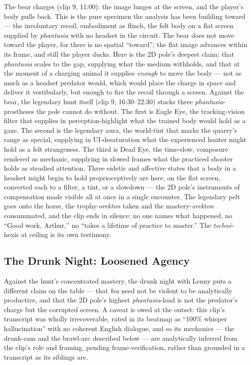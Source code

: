 The bear charges (clip 9, 11:00): the image lunges at the screen, and the player's body pulls back. This is the pure specimen the analysis has been building toward — the involuntary recoil, embodiment as flinch, the felt body on a flat screen supplied by \textit{phantasia} with no headset in the circuit. The bear does not move toward the player, for there is no spatial ``toward''; the flat image advances within its frame, and still the player ducks. Here is the 2D pole's deepest claim: that \textit{phantasia} scales to the gap, supplying what the medium withholds, and that at the moment of a charging animal it supplies \textit{enough} to move the body — not as much as a headset predator would, which would place the charge in space and deliver it vestibularly, but enough to fire the recoil through a screen. Against the bear, the legendary hunt itself (clip 9, 16:30–22:30) stacks three \textit{phantasia}-prostheses the pole cannot do without. The first is Eagle Eye, the tracking-vision filter that supplies in perception-highlight what the trained body would hold as a gaze. The second is the legendary aura, the world-tint that marks the quarry's range as special, supplying in UI-desaturation what the experienced hunter might hold as a felt strangeness. The third is Dead Eye, the time-slow, composure rendered as mechanic, supplying in slowed frames what the practiced shooter holds as steadied attention. Three eidetic and affective states that a body in a headset might begin to hold proprioceptively are here, on the flat screen, converted each to a filter, a tint, or a slowdown — the 2D pole's instruments of compensation made visible all at once in a single encounter. The legendary pelt goes onto the horse, the trophy-\textit{orekton} taken and the mastery-\textit{orekton} consummated, and the clip ends in silence: no one names what happened, no ``Good work, Arthur,'' no ``takes a lifetime of practice to master.'' The \textit{technē}-hexis at ceiling is its own testimony.

\bigskip

\subsection*{The Drunk Night: Loosened Agency}

Against the hunt's concentrated mastery, the drunk night with Lenny puts a different claim on the table — that \textit{bia} need not be violent to be analytically productive, and that the 2D pole's highest \textit{phantasia}-load is not the predator's charge but the corrupted screen. A caveat is owed at the outset: this clip's transcript was wholly irrecoverable, rated in its beatmap as ``100\% whisper hallucination'' with no coherent English dialogue, and so its mechanics — the drunk-cam and the brawl-arc described below — are analytically inferred from the clip's role and framing, pending frame-verification, rather than grounded in a transcript as its siblings are.

